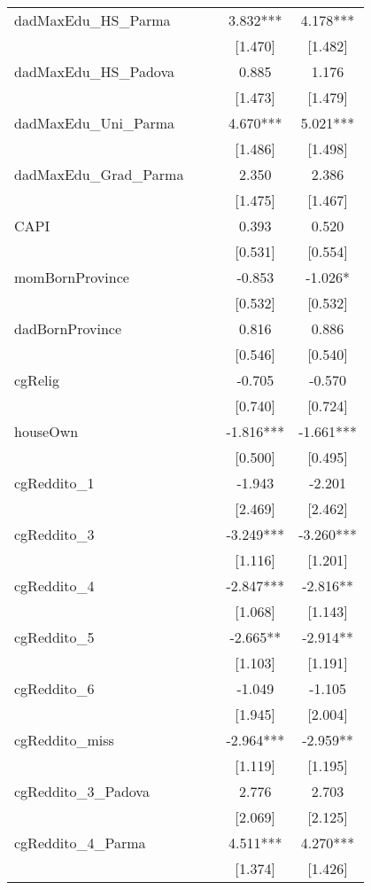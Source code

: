 \documentclass[]{article}
\begin{document}
\begin{tabular}{lcccc}
dadMaxEdu\_HS\_Parma &  &  & 3.832*** & 4.178*** \\
 &  &  & [1.470] & [1.482] \\
dadMaxEdu\_HS\_Padova &  &  & 0.885 & 1.176 \\
 &  &  & [1.473] & [1.479] \\
dadMaxEdu\_Uni\_Parma &  &  & 4.670*** & 5.021*** \\
 &  &  & [1.486] & [1.498] \\
dadMaxEdu\_Grad\_Parma &  &  & 2.350 & 2.386 \\
 &  &  & [1.475] & [1.467] \\
CAPI &  &  & 0.393 & 0.520 \\
 &  &  & [0.531] & [0.554] \\
momBornProvince &  &  & -0.853 & -1.026* \\
 &  &  & [0.532] & [0.532] \\
dadBornProvince &  &  & 0.816 & 0.886 \\
 &  &  & [0.546] & [0.540] \\
cgRelig &  &  & -0.705 & -0.570 \\
 &  &  & [0.740] & [0.724] \\
houseOwn &  &  & -1.816*** & -1.661*** \\
 &  &  & [0.500] & [0.495] \\
cgReddito\_1 &  &  & -1.943 & -2.201 \\
 &  &  & [2.469] & [2.462] \\
cgReddito\_3 &  &  & -3.249*** & -3.260*** \\
 &  &  & [1.116] & [1.201] \\
cgReddito\_4 &  &  & -2.847*** & -2.816** \\
 &  &  & [1.068] & [1.143] \\
cgReddito\_5 &  &  & -2.665** & -2.914** \\
 &  &  & [1.103] & [1.191] \\
cgReddito\_6 &  &  & -1.049 & -1.105 \\
 &  &  & [1.945] & [2.004] \\
cgReddito\_miss &  &  & -2.964*** & -2.959** \\
 &  &  & [1.119] & [1.195] \\
cgReddito\_3\_Padova &  &  & 2.776 & 2.703 \\
 &  &  & [2.069] & [2.125] \\
cgReddito\_4\_Parma &  &  & 4.511*** & 4.270*** \\
 &  &  & [1.374] & [1.426] \\

\end{tabular}
\end{document}
